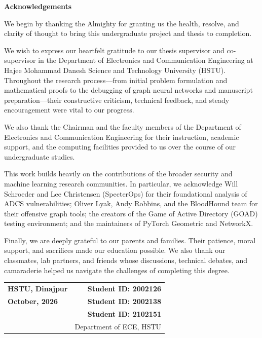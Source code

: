 \thispagestyle{plain}
\begin{center}
    {\fontsize{18pt}{22pt}\selectfont \textbf{Acknowledgements} \par}
\end{center}

\vspace{0.8cm}
\noindent We begin by thanking the Almighty for granting us the health, resolve, and clarity of thought to bring this undergraduate project and thesis to completion.

We wish to express our heartfelt gratitude to our thesis supervisor and co-supervisor in the Department of Electronics and Communication Engineering at Hajee Mohammad Danesh Science and Technology University (HSTU). Throughout the research process—from initial problem formulation and mathematical proofs to the debugging of graph neural networks and manuscript preparation—their constructive criticism, technical feedback, and steady encouragement were vital to our progress.

We also thank the Chairman and the faculty members of the Department of Electronics and Communication Engineering for their instruction, academic support, and the computing facilities provided to us over the course of our undergraduate studies.

This work builds heavily on the contributions of the broader security and machine learning research communities. In particular, we acknowledge Will Schroeder and Lee Christensen (SpecterOps) for their foundational analysis of ADCS vulnerabilities; Oliver Lyak, Andy Robbins, and the BloodHound team for their offensive graph tools; the creators of the Game of Active Directory (GOAD) testing environment; and the maintainers of PyTorch Geometric and NetworkX.

Finally, we are deeply grateful to our parents and families. Their patience, moral support, and sacrifices made our education possible. We also thank our classmates, lab partners, and friends whose discussions, technical debates, and camaraderie helped us navigate the challenges of completing this degree.

\vspace{1.5cm}
\noindent
\begin{tabular*}{\textwidth}{@{\extracolsep{\fill}}lr}
    \textbf{HSTU, Dinajpur} & \textbf{Student ID: 2002126} \\
    \textbf{October, 2026} & \textbf{Student ID: 2002138} \\
    & \textbf{Student ID: 2102151} \\
    & Department of ECE, HSTU
\end{tabular*}
